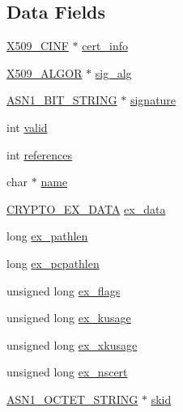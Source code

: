 \subsection*{Data Fields}
\begin{DoxyCompactItemize}
\item 
\hyperlink{crypto_2x509_2x509_8h_adf52d084ce690fb5335dce1c5ebd0502}{X509\+\_\+\+C\+I\+NF} $\ast$ \hyperlink{structx509__st_a72f4d64a91ed0421143507326f961328}{cert\+\_\+info}
\item 
\hyperlink{crypto_2ossl__typ_8h_aa2b6185e6254f36f709cd6577fb5022e}{X509\+\_\+\+A\+L\+G\+OR} $\ast$ \hyperlink{structx509__st_a48635ef8176d7ad1ab56a1088f7321fb}{sig\+\_\+alg}
\item 
\hyperlink{crypto_2ossl__typ_8h_af837aaa00e151b1e8773aea5a8fe1cc4}{A\+S\+N1\+\_\+\+B\+I\+T\+\_\+\+S\+T\+R\+I\+NG} $\ast$ \hyperlink{structx509__st_a0ded22400c40848a864a98aeb7946f1a}{signature}
\item 
int \hyperlink{structx509__st_ac63b1f168765a53e565a8ba27f5469d1}{valid}
\item 
int \hyperlink{structx509__st_a146fdb34d9a909e530adf8b189481195}{references}
\item 
char $\ast$ \hyperlink{structx509__st_ad547fb8186b526cb1b588daad4334fbe}{name}
\item 
\hyperlink{crypto_2ossl__typ_8h_a7eaff1c18057495d8af18f22d1370b51}{C\+R\+Y\+P\+T\+O\+\_\+\+E\+X\+\_\+\+D\+A\+TA} \hyperlink{structx509__st_ac3e4fd59d6ee44a81f3a58114613c1e2}{ex\+\_\+data}
\item 
long \hyperlink{structx509__st_a4b0b3ef6b67555028523786658c85002}{ex\+\_\+pathlen}
\item 
long \hyperlink{structx509__st_ad0930d0756ed4e567cb07cd21938a5be}{ex\+\_\+pcpathlen}
\item 
unsigned long \hyperlink{structx509__st_affd7c15a4eeebd4b67eb29baa4dce58a}{ex\+\_\+flags}
\item 
unsigned long \hyperlink{structx509__st_a11b6b85c2d94c7331e52c8f0eafe99f8}{ex\+\_\+kusage}
\item 
unsigned long \hyperlink{structx509__st_a4f9246ca64bd2a8fda7e0e6c72939e92}{ex\+\_\+xkusage}
\item 
unsigned long \hyperlink{structx509__st_ac0ee43f888c3259b4b1e82f1ea4571d0}{ex\+\_\+nscert}
\item 
\hyperlink{crypto_2ossl__typ_8h_afbd05e94e0f0430a2b729473efec88c1}{A\+S\+N1\+\_\+\+O\+C\+T\+E\+T\+\_\+\+S\+T\+R\+I\+NG} $\ast$ \hyperlink{structx509__st_a40975b81fc3038ee271eac4fac1af7c1}{skid}
\item 

\end{DoxyCompactItemize}

